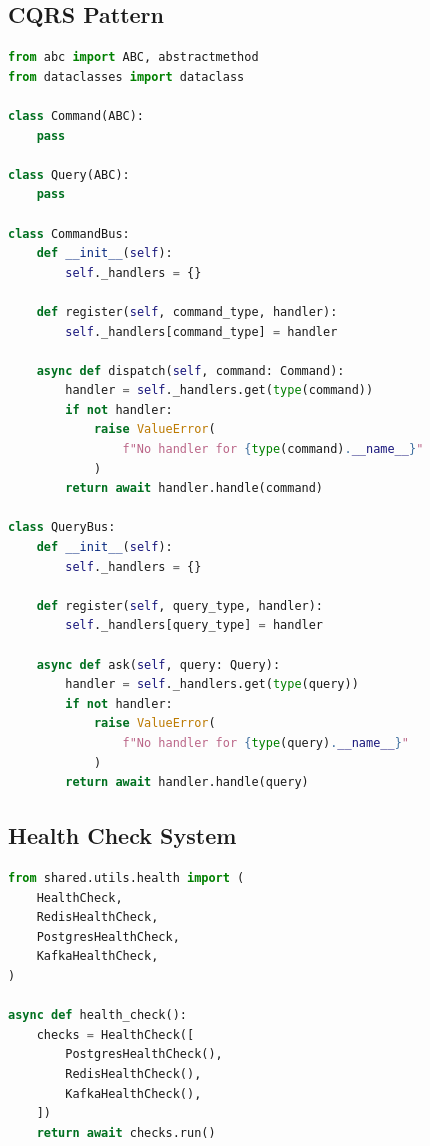 \documentclass[11pt,a4paper]{article}
\begin{document}
\subsection{CQRS Pattern}

\begin{lstlisting}[language=Python, caption=Command and Query Bus]
from abc import ABC, abstractmethod
from dataclasses import dataclass

class Command(ABC):
    pass

class Query(ABC):
    pass

class CommandBus:
    def __init__(self):
        self._handlers = {}

    def register(self, command_type, handler):
        self._handlers[command_type] = handler

    async def dispatch(self, command: Command):
        handler = self._handlers.get(type(command))
        if not handler:
            raise ValueError(
                f"No handler for {type(command).__name__}"
            )
        return await handler.handle(command)

class QueryBus:
    def __init__(self):
        self._handlers = {}

    def register(self, query_type, handler):
        self._handlers[query_type] = handler

    async def ask(self, query: Query):
        handler = self._handlers.get(type(query))
        if not handler:
            raise ValueError(
                f"No handler for {type(query).__name__}"
            )
        return await handler.handle(query)
\end{lstlisting}

\subsection{Health Check System}

\begin{lstlisting}[language=Python, caption=Health Check Implementation]
from shared.utils.health import (
    HealthCheck,
    RedisHealthCheck,
    PostgresHealthCheck,
    KafkaHealthCheck,
)

async def health_check():
    checks = HealthCheck([
        PostgresHealthCheck(),
        RedisHealthCheck(),
        KafkaHealthCheck(),
    ])
    return await checks.run()
\end{lstlisting}

\clearpage

\end{document}
